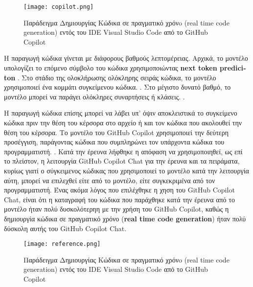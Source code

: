 \begin{figure}[H]
  \begin{center}
    \texttt{[image: copilot.png]}
    \label{fig:codeGen}
    \caption{Παράδειγμα Δημιουργίας Κώδικα σε πραγματικό χρόνo \textlatin{(real time code generation)} εντός του \textlatin{IDE} \textlatin{Visual Studio Code} από το \textlatin{GitHub Copilot } }
  \end{center}
\end{figure}


H παραγωγή κώδικα γίνεται με διάφορους βαθμούς λεπτομέρειας. Αρχικά, το μοντέλο υπολογίζει το επόμενο σύμβολο του κώδικα χρησιμοποιώντας \textlatin{\textbf{next token prediciton}} \cite{Izadi2022,Kim2021,Wang2021,Feng2020,Ciniselli2021b,Ciniselli2021a}. Στο στάδιο της ολοκλήρωσης ολόκληρης σειράς κώδικα, το μοντέλο χρησιμοποιεί ένα κομμάτι συγκείμενου κώδικα. \cite{Izadi2022,Guo2022,Svyatkovskiy2020,Lu2021}. Στο μέγιστο δυνατό βαθμό, το μοντέλο μπορεί να παράγει ολόκληρες συναρτήσεις ή κλάσεις. \cite{fried2023incoder,Guo2022,githubcopilot}.

Η παραγωγή κώδικα επίσης μπορεί να λάβει υπ' όψιν αποκλειστικά το συγκείμενο κώδικα πριν την θέση του κέρσορα στο αρχείο ή και τον κώδικα που ακολουθεί την θέση του κέρσορα. \cite{izadi2024language} Το μοντέλο του \textlatin{GitHub Copilot} χρησιμοποιεί την δεύτερη προσέγγιση, παράγοντας κώδικα που συμπληρώνει τον υπάρχοντα κώδικα του προγραμματιστή. \cite{githubcopilot,fried2023incoder, wang2021codet5}. Κατά την έρευνα λήφθηκε η απόφαση να χρησιμοποιηθεί, ως επί το πλείστον, η λειτουργία \textlatin{GitHub Copilot Chat} για την έρευνα και τα πειράματα, κυρίως γιατί ο σύγκειμενος κώδικας που χρησιμοποιεί το μοντέλο κατά την λειτουργία αύτη, μπορεί να επιλεχθεί είτε από το μοντέλο, είτε συγκεκριμένα από τον προγραμματιστή. Ένας ακόμα λόγος που επιλέχθηκε η χηση του \textlatin{GitHub Copilot Chat}, είναι ότι η καταγραφή του κώδικα που παράχθηκε κατά την έρευνα από το μοντέλο ήταν πολύ δυσκολότερηη με την χρήση του \textlatin{GitHub Copilot}, καθώς η δημιουργία κώδικα σε πραγματικό χρόνο \textlatin{(\textbf{real time code generation})} ήταν πολύ δύσκολη αυτής του \textlatin{GitHub Copilot Chat}.

\begin{figure}[H]
  \begin{center}
    \texttt{[image: reference.png]}
    \label{fig:reference}
    \caption{Παράδειγμα Δημιουργίας Κώδικα σε πραγματικό χρόνo \textlatin{(real time code generation)} εντός του \textlatin{IDE} \textlatin{Visual Studio Code} από το \textlatin{GitHub Copilot } }
  \end{center}
\end{figure}



